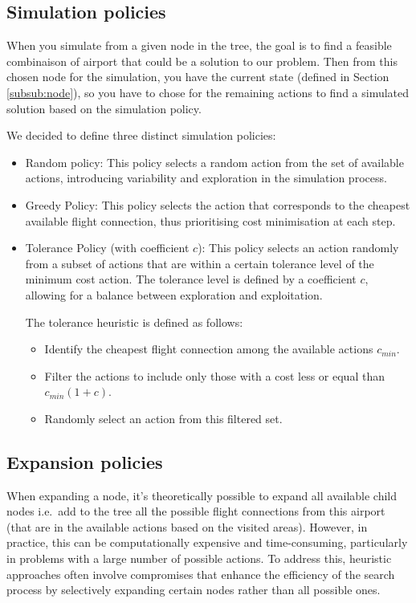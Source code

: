 \subsection{Simulation policies}
When you simulate from a given node in the tree, the goal is to find a feasible combinaison of airport that could be a solution to our problem.
Then from this chosen node for the simulation, you have the current state (defined in Section \ref{subsub:node}), so you have to chose for the remaining actions to find a simulated solution based on the simulation policy.

We decided to define three distinct simulation policies:

\begin{itemize}
    \item Random policy: This policy selects a random action from the set of available actions, introducing variability and exploration in the simulation process.
    \item Greedy Policy: This policy selects the action that corresponds to the cheapest available flight connection, thus prioritising cost minimisation at each step.

    \item Tolerance Policy (with coefficient $c$):
          This policy selects an action randomly from a subset of actions that are within a certain tolerance level of the minimum cost action. The tolerance level is defined by a coefficient $c$, allowing for a balance between exploration and exploitation.

          The tolerance heuristic is defined as follows:
          \begin{itemize}
              \item Identify the cheapest flight connection among the available actions $c_{min}$.
              \item Filter the actions to include only those with a cost less or equal than $c_{min}(1+c) $.
              \item Randomly select an action from this filtered set.
          \end{itemize}

\end{itemize}

\subsection{Expansion policies}
When expanding a node, it’s theoretically possible to expand all available child nodes i.e.\ add to the tree all the possible flight connections from this airport (that are in the available actions based on the visited areas). However, in practice, this can be computationally expensive and time-consuming, particularly in problems with a large number of possible actions. To address this, heuristic approaches often involve compromises that enhance the efficiency of the search process by selectively expanding certain nodes rather than all possible ones.

